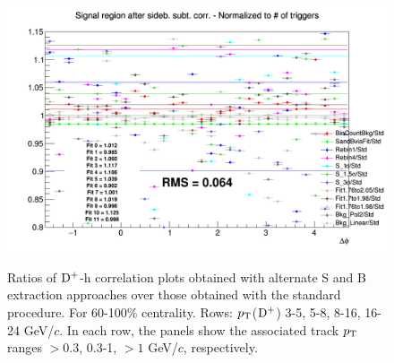 \begin{figure}
{\includegraphics[width=0.31\linewidth]{Centrality_DPlus/Dplus/Systematic/60_100/Yield/Ratio_AzimCorrDistr_Dplus_Canvas_PtIntBins11to11_PoolInt_thr1dotto99dot.png}} \\
 \caption{Ratios of ${\rm D^+}$-h correlation plots obtained with alternate S and B extraction approaches over those obtained with the standard procedure. For 60-100\% centrality. Rows: $p_{\rm T}$(${\rm D^+}$) 3-5, 5-8, 8-16, 16-24 GeV/$c$. In each row, the panels show the associated track
$p_{\rm T}$ ranges $> 0.3$, 0.3-1, $> 1$ GeV/$c$, respectively.}
\label{fig:SysSandB60100_Dplus}
\end{figure}


